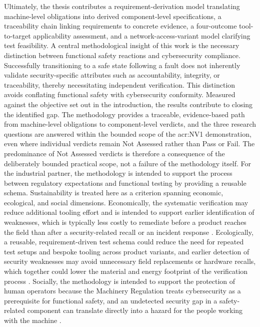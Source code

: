 Ultimately, the thesis contributes a requirement-derivation model translating machine-level obligations into derived component-level specifications, a traceability chain linking requirements to concrete evidence, a four-outcome tool-to-target applicability assessment, and a network-access-variant model clarifying test feasibility. A central methodological insight of this work is the necessary distinction between functional safety reactions and cybersecurity compliance. Successfully transitioning to a safe state following a fault does not inherently validate security-specific attributes such as accountability, integrity, or traceability, thereby necessitating independent verification. This distinction avoids conflating functional safety with cybersecurity conformity. Measured against the objective set out in the introduction, the results contribute to closing the identified gap. The methodology provides a traceable, evidence-based path from machine-level obligations to component-level verdicts, and the three research questions are answered within the bounded scope of the \gls{acr:NV1} demonstration, even where individual verdicts remain Not Assessed rather than Pass or Fail. The predominance of Not Assessed verdicts is therefore a consequence of the deliberately bounded practical scope, not a failure of the methodology itself.
For the industrial partner, the methodology is intended to support the process between regulatory expectations and functional testing by providing a reusable schema. Sustainability is treated here as a criterion spanning economic, ecological, and social dimensions. Economically, the systematic verification may reduce additional tooling effort and is intended to support earlier identification of weaknesses, which is typically less costly to remediate before a product reaches the field than after a security-related recall or an incident response \cite{nist_software_testing_2002} \Cite[p. 67]{NIST.SP.800-82r3}. Ecologically, a reusable, requirement-driven test schema could reduce the need for repeated test setups and bespoke tooling across product variants, and earlier detection of security weaknesses may avoid unnecessary field replacements or hardware recalls, which together could lower the material and energy footprint of the verification process \Cite{gsf_hardware_efficiency_de}. Socially, the methodology is intended to support the protection of human operators because the Machinery Regulation treats cybersecurity as a prerequisite for functional safety, and an undetected security gap in a safety-related component can translate directly into a hazard for the people working with the machine \cite[p. 4]{EU2023_1230}.


